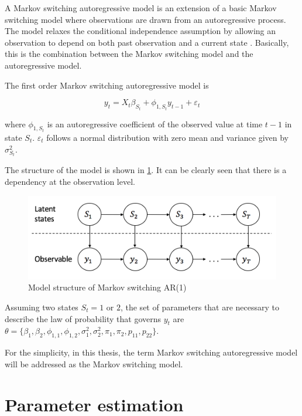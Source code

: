 A Markov switching autoregressive model is an extension of a basic
Markov switching model where observations are drawn from an autoregressive
process. The model relaxes the conditional independence assumption
by allowing an observation to depend on both past observation and
a current state \citep{shannon2009formulation}. Basically, this is
the combination between the Markov switching model and the autoregressive
model.
\begin{defn}
The first order Markov switching autoregressive model is 

\[
y_{t}=X_{t}\beta_{S_{t}}+\phi_{1,S_{t}}y_{t-1}+\varepsilon_{t}
\]

where $\phi_{1,S_{t}}$ is an autoregressive coefficient of the observed
value at time $t-1$ in state $S_{t}$. $\varepsilon_{t}$ follows
a normal distribution with zero mean and variance given by $\sigma_{S_{t}}^{2}$.
\end{defn}
The structure of the model is shown in \ref{msm-ar}. It can be clearly
seen that there is a dependency at the observation level.

\begin{figure}[H]
\begin{centering}
\includegraphics[scale=0.6]{picture/msm-ar1}
\par\end{centering}
\caption{Model structure of Markov switching AR(1)}
\label{msm-ar}
\end{figure}

Assuming two states $S_{t}=1$ or $2$, the set of parameters that
are necessary to describe the law of probability that governs $y_{t}$
are $\theta=\{\beta_{1},\beta_{2},\phi_{1,1},\phi_{1,2},\sigma_{1}^{2},\sigma_{2}^{2},\pi_{1},\pi_{2},p_{11},p_{22}\}$. 

For the simplicity, in this thesis, the term Markov switching autoregressive
model will be addressed as the Markov switching model.

\section{Parameter estimation}

